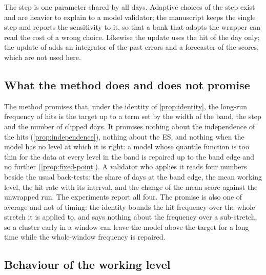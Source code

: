 The step is one parameter shared by all days. Adaptive choices of the step exist \citep{zaffran2022,gibbs2024,bhatnagar2023} and are heavier to explain to a model validator; the manuscript keeps the single step and reports the sensitivity to it, so that a bank that adopts the wrapper can read the cost of a wrong choice. Likewise the update uses the hit of the day only; the update of \citet{angelopoulos2023} adds an integrator of the past errors and a forecaster of the scores, which are not used here.

\subsection{What the method does and does not promise}
\label{sec:method-promise}

The method promises that, under the identity of \cref{prop:identity}, the long-run frequency of hits is the target up to a term set by the width of the band, the step and the number of clipped days. It promises nothing about the independence of the hits (\cref{prop:independence}), nothing about the ES, and nothing when the model has no level at which it is right: a model whose quantile function is too thin for the data at every level in the band is repaired up to the band edge and no further (\cref{prop:fixed-point}). A validator who applies it reads four numbers beside the usual back-tests: the share of days at the band edge, the mean working level, the hit rate with its interval, and the change of the mean score against the unwrapped run. The experiments report all four. The promise is also one of average and not of timing: the identity bounds the hit frequency over the whole stretch it is applied to, and says nothing about the frequency over a sub-stretch, so a cluster early in a window can leave the model above the target for a long time while the whole-window frequency is repaired.

\subsection{Behaviour of the working level}
\label{sec:method-dynamics}

